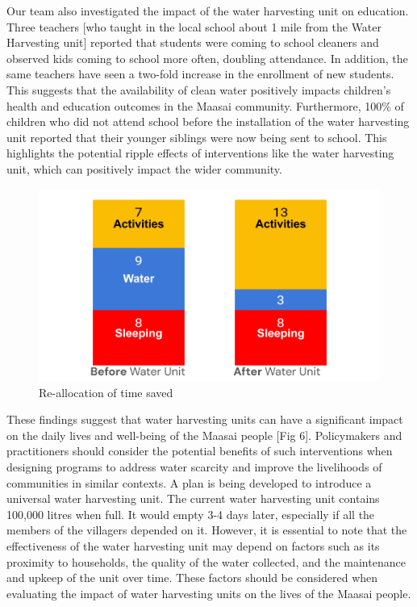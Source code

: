 \documentclass[10pt, twocolumn]{article}
\begin{document}
Our team also investigated the impact of the water harvesting unit on education. Three teachers [who taught in the local school about 1 mile from the Water Harvesting unit] reported that students were coming to school cleaners and observed kids coming to school more often, doubling attendance. In addition, the same teachers have seen a two-fold  increase in the enrollment of new students. This suggests that the availability of clean water positively impacts children's health and education outcomes in the Maasai community. Furthermore, 100\% of children who did not attend school before the installation of the water harvesting unit reported that their younger siblings were now being sent to school. This highlights the potential ripple effects of interventions like the water harvesting unit, which can positively impact the wider community. 

\begin{figure}
    \centering
    \includegraphics[width=1\linewidth]{photos/time_reallocation.png}
    \caption{Re-allocation of time saved}
    \label{fig:reallocation}
\end{figure}

These findings suggest that water harvesting units can have a significant impact on the daily lives and well-being of the Maasai people [Fig 6]. Policymakers and practitioners should consider the potential benefits of such interventions when designing programs to address water scarcity and improve the livelihoods of communities in similar contexts. A plan is being developed to introduce a universal water harvesting unit. The current water harvesting unit contains 100,000 litres when full. It would empty 3-4 days later, especially if all the members of the villagers depended on it. However, it is essential to note that the effectiveness of the water harvesting unit may depend on factors such as its proximity to households, the quality of the water collected, and the maintenance and upkeep of the unit over time. These factors should be considered when evaluating the impact of water harvesting units on the lives of the Maasai people.
\end{document}
